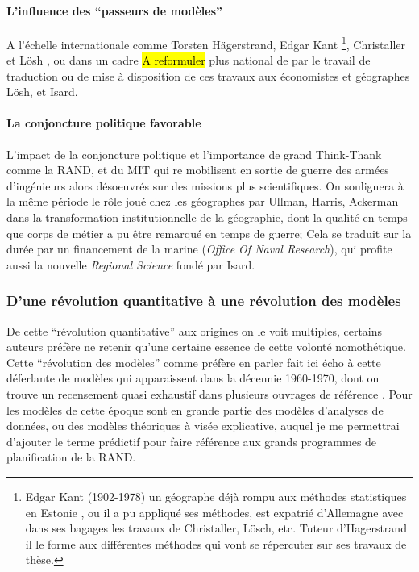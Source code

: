 \paragraph{L'influence des \enquote{passeurs de modèles}}

A l'échelle internationale comme Torsten Hägerstrand, Edgar Kant \footnote{Edgar Kant (1902-1978) un géographe déjà rompu aux méthodes statistiques en Estonie \autocite{Chabot1937} , ou il a pu appliqué ses méthodes, est expatrié d'Allemagne avec dans ses bagages les travaux de Christaller, Lösch, etc. Tuteur d'Hagerstrand il le forme aux différentes méthodes qui vont se répercuter sur ses travaux de thèse.}, Christaller et Lösh \autocite[119]{Berry1970}, ou dans un cadre \hl{A reformuler } plus national de par le travail de traduction ou de mise à disposition de ces travaux aux économistes et géographes Lösh, et Isard.

\paragraph{La conjoncture politique favorable}

L'impact de la conjoncture politique et l'importance de grand Think-Thank comme la RAND, et du MIT qui re mobilisent en sortie de guerre des armées d'ingénieurs alors désoeuvrés sur des missions plus scientifiques. On soulignera à la même période le rôle joué chez les géographes par Ullman, Harris, Ackerman dans la transformation institutionnelle de la géographie, dont la qualité en temps que corps de métier a pu être remarqué en temps de guerre; Cela se traduit sur la durée par un financement de la marine (\textit{Office Of Naval Research}), qui profite aussi la nouvelle \textit{Regional Science} fondé par Isard.

\subsubsection{D'une révolution quantitative à une révolution des modèles}

De cette \enquote{révolution quantitative} aux origines on le voit multiples, certains auteurs préfère ne retenir qu'une certaine essence de cette volonté nomothétique. Cette \enquote{révolution des modèles} comme préfère en parler \textcite{Wilson1970} \autocite{Varenne2014} fait ici écho à cette déferlante de modèles qui apparaissent dans la décennie 1960-1970, dont on trouve un recensement quasi exhaustif dans plusieurs ouvrages de référence \autocite{Haggett1965,Chorley1967}. Pour \autocite{Varenne2014} les modèles de cette époque sont en grande partie des modèles d'analyses de données, ou des modèles théoriques à visée explicative, auquel je me permettrai d'ajouter le terme prédictif pour faire référence aux grands programmes de planification de la RAND.

